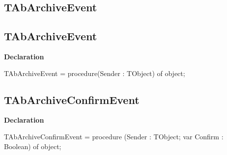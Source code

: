 \documentclass{report}
\newif\ifpdf
\begin{document}
\subsection*{\large{\textbf{TAbArchiveEvent}}\normalsize\hspace{1ex}\hrulefill}
\else
\subsection*{TAbArchiveEvent}
\fi
\label{AbArcTyp-TAbArchiveEvent}
\begin{list}{}{
\setlength{\itemindent}{0cm}
\setlength{\listparindent}{0cm}
\setlength{\leftmargin}{\evensidemargin}
\addtolength{\leftmargin}{\tmplength}
\settowidth{\labelsep}{X}
\addtolength{\leftmargin}{\labelsep}
\setlength{\labelwidth}{\tmplength}
}
\item[\textbf{Declaration}\hfill]
\ifpdf
\begin{flushleft}
\fi
\begin{ttfamily}
TAbArchiveEvent = procedure(Sender : TObject) of object;\end{ttfamily}

\ifpdf
\end{flushleft}
\fi

\end{list}
\ifpdf
\subsection*{\large{\textbf{TAbArchiveConfirmEvent}}\normalsize\hspace{1ex}\hrulefill}
\else
\subsection*{TAbArchiveConfirmEvent}
\fi
\label{AbArcTyp-TAbArchiveConfirmEvent}
\begin{list}{}{
\setlength{\itemindent}{0cm}
\setlength{\listparindent}{0cm}
\setlength{\leftmargin}{\evensidemargin}
\addtolength{\leftmargin}{\tmplength}
\settowidth{\labelsep}{X}
\addtolength{\leftmargin}{\labelsep}
\setlength{\labelwidth}{\tmplength}
}
\item[\textbf{Declaration}\hfill]
\ifpdf
\begin{flushleft}
\fi
\begin{ttfamily}
TAbArchiveConfirmEvent = procedure (Sender : TObject; var Confirm : Boolean) of object;\end{ttfamily}

\ifpdf
\end{flushleft}
\fi

\end{list}
\ifpdf
\end{document}
